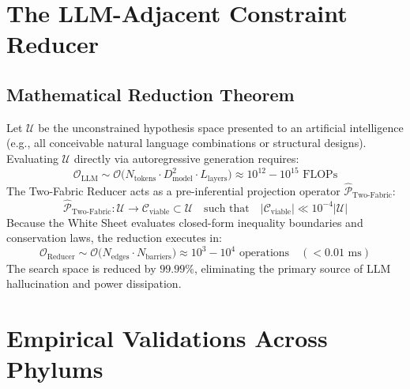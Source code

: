 \documentclass[11pt,a4paper]{article}
\begin{document}
\section{The LLM-Adjacent Constraint Reducer}

\subsection{Mathematical Reduction Theorem}
Let $\mathcal{U}$ be the unconstrained hypothesis space presented to an artificial intelligence (e.g., all conceivable natural language combinations or structural designs). Evaluating $\mathcal{U}$ directly via autoregressive generation requires:
\begin{equation}
    \mathcal{O}_{\text{LLM}} \sim \mathcal{O}\big(N_{\text{tokens}} \cdot D_{\text{model}}^2 \cdot L_{\text{layers}}\big) \approx 10^{12} - 10^{15} \text{ FLOPs}
\end{equation}
The Two-Fabric Reducer acts as a pre-inferential projection operator $\hat{\mathcal{P}}_{\text{Two-Fabric}}$:
\begin{equation}
    \hat{\mathcal{P}}_{\text{Two-Fabric}}: \mathcal{U} \longrightarrow \mathcal{C}_{\text{viable}} \subset \mathcal{U} \quad \text{such that} \quad |\mathcal{C}_{\text{viable}}| \ll 10^{-4} |\mathcal{U}|
\end{equation}
Because the White Sheet evaluates closed-form inequality boundaries and conservation laws, the reduction executes in:
\begin{equation}
    \mathcal{O}_{\text{Reducer}} \sim \mathcal{O}\big(N_{\text{edges}} \cdot N_{\text{barriers}}\big) \approx 10^3 - 10^4 \text{ operations} \quad (< 0.01\text{ ms})
\end{equation}
The search space is reduced by $99.99\%$, eliminating the primary source of LLM hallucination and power dissipation.

\section{Empirical Validations Across Phylums}
\end{document}
